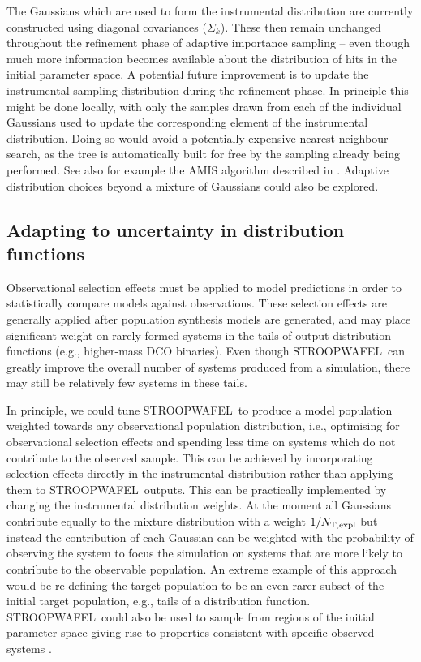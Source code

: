 \documentclass[a4paper,fleqn,usenatbib,useAMS,usedcolumn]{mnras}
\newcommand{\AISs}{\textsc{STROOPWAFEL}}
\begin{document}
The Gaussians which are used to form the instrumental distribution are currently constructed using diagonal covariances ($\Sigma_k$).    These then remain unchanged throughout the refinement phase of adaptive importance sampling -- even though much more information becomes available about the distribution of hits in the initial parameter space.   A potential future improvement is to update the instrumental sampling distribution during the refinement phase.    In principle this might be done locally, with only the samples drawn from each of the individual Gaussians used to update the corresponding element of the instrumental distribution.  Doing so would avoid a potentially expensive nearest-neighbour search, as the tree is automatically built for free by the sampling already being performed. See also for example the AMIS algorithm described in  \citet{cornuet2012adaptive}.  Adaptive distribution choices beyond a mixture of Gaussians could also be explored.


\subsection{Adapting to uncertainty in distribution functions}
\label{subsec:discussion-adaptingUncertainty}

Observational selection effects must be applied to model predictions in order to statistically compare models against observations.  These selection effects are generally applied after population synthesis models are generated, and may place significant weight on rarely-formed systems in the tails of output distribution functions (e.g., higher-mass DCO binaries).  Even though  \AISs \ can greatly improve the overall number of systems produced from a simulation, there may still be relatively few systems in these tails.

In principle, we could tune \AISs \ to produce a model population weighted towards any observational population distribution, i.e., optimising for observational selection effects and spending less time on systems which do not contribute to the observed sample. This can be achieved by incorporating selection effects directly in the instrumental distribution rather than applying them to \AISs \ outputs.  This can be practically implemented by changing the instrumental distribution weights. At the moment all Gaussians contribute equally to the mixture distribution with a weight $ 1 / N_{\rm{T, expl}}$ but instead the contribution of each Gaussian can be weighted with the probability of observing the system to focus the simulation on systems that are more likely to contribute to the observable population.  An extreme example of this approach would be re-defining the target population to be an even rarer subset of the initial target population, e.g., tails of a distribution function. \AISs \ could also be used to sample from regions of the initial parameter space giving rise to properties consistent with specific observed systems \citep[see also][]{andrews2017dart_board}.
\end{document}
